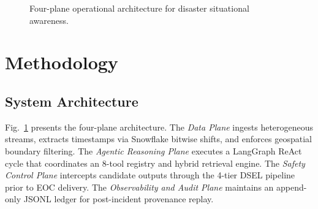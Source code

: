 \documentclass[conference]{IEEEtran}
\begin{document}
\begin{figure}[ht]
{%
}%
\caption{Four-plane operational architecture for disaster situational awareness.}
\label{fig:arch}
\end{figure}

\section{Methodology}

\subsection{System Architecture}
Fig.~\ref{fig:arch} presents the four-plane architecture. The \textit{Data Plane} ingests heterogeneous streams, extracts timestamps via Snowflake bitwise shifts, and enforces geospatial boundary filtering. The \textit{Agentic Reasoning Plane} executes a LangGraph ReAct cycle that coordinates an 8-tool registry and hybrid retrieval engine. The \textit{Safety Control Plane} intercepts candidate outputs through the 4-tier DSEL pipeline prior to EOC delivery. The \textit{Observability and Audit Plane} maintains an append-only JSONL ledger for post-incident provenance replay.
\end{document}
